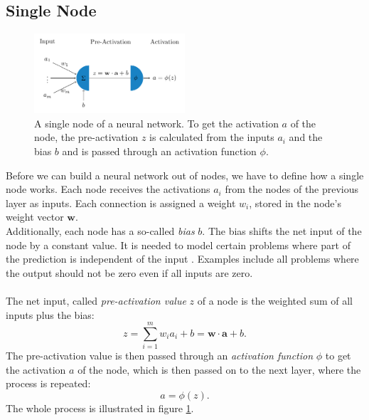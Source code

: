 \subsection{Single Node}
\label{subsec:single-neuron}
\begin{figure}
    \centering
    \includegraphics[width=0.5\textwidth]{single_neuron}
    \caption{A single node of a neural network. To get the activation $a$ of the node, the pre-activation $z$ is calculated from the inputs $a_i$ and the bias $b$ and is passed through an activation function $\phi$.}
    \label{fig:single-neuron}
\end{figure}
Before we can build a neural network out of nodes, we have to define how a single node works.
Each node receives the activations $a_i$ from the nodes of the previous layer as inputs. 
Each connection is assigned a weight $w_i$, stored in the node's weight vector $\bm{w}$.
\\
Additionally, each node has a so-called \textit{bias} $b$. 
The bias shifts the net input of the node by a constant value.
It is needed to model certain problems where part of the prediction is independent of the input \cite[6]{aggarwal_neural_2018}.
Examples include all problems where the output should not be zero even if all inputs are zero. 
\\
\\
The net input, called \textit{pre-activation value} $z$ of a node is the weighted sum of all inputs plus the bias:
\begin{equation}
    z = \sum_{i=1}^{m} w_i a_i + b = \bm{w} \cdot \bm{a} + b \text{.}
    \label{eq:pre-activation}
\end{equation}
The pre-activation value is then passed through an \textit{activation function} $\phi$ to get the activation $a$ of the node, which is then passed on to the next layer, where the process is repeated:
\begin{equation}
    a = \phi(z) \text{.}
    \label{eq:activation}
\end{equation}
The whole process is illustrated in figure \ref{fig:single-neuron}.

